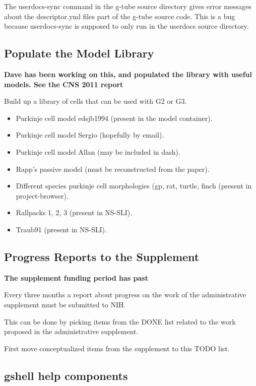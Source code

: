 \documentclass[12pt]{article}
\begin{document}
The userdocs-sync command in the g-tube source directory gives error
messages about the descriptor.yml files part of the g-tube source
code.  This is a bug because userdocs-sync is supposed to only run in
the userdocs source directory.


\subsection{Populate the Model Library}

{\bf Dave has been working on this, and populated the library with
  useful models.  See the CNS 2011 report}

Build up a library of cells that can be used with G2 or G3.

\begin{itemize}
\item Purkinje cell model edsjb1994 (present in the model container).
\item Purkinje cell model Sergio (hopefully by email).
\item Purkinje cell model Allan (may be included in dash).
\item Rapp's passive model (must be reconstructed from the paper).
\item Different species purkinje cell morphologies (gp, rat, turtle,
  finch (present in project-browser).
\item Rallpacks 1, 2, 3 (present in NS-SLI).
\item Traub91 (present in NS-SLI).
\end{itemize}


\subsection{Progress Reports to the Supplement}

{\bf The supplement funding period has past}

Every three months a report about progress on the work of the
administrative supplement must be submitted to NIH.

This can be done by picking items from the DONE list related to the
work proposed in the administrative supplement.

First move conceptualized items from the supplement to this TODO list.


\subsection{gshell help components}
\end{document}
